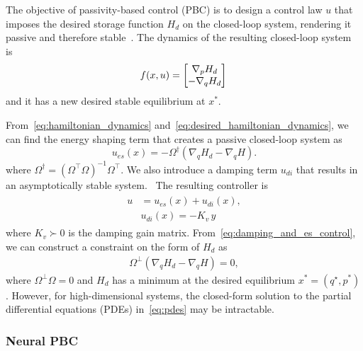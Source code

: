 The objective of passivity-based control (PBC) is to design a control law $u$
that imposes the desired storage function $H_d$ on the closed-loop system,
rendering it passive and therefore stable~\cite{van2000l2}.
%
The dynamics of the resulting closed-loop system is~
\begin{align}
  \begin{split}  
    f(x, u) &= \begin{bmatrix}\nabla_pH_d \\ -\nabla_qH_d\end{bmatrix}\, \\
  \end{split}
  \label{eq:desired_hamiltonian_dynamics}
\end{align}
\noindent and it has a new desired stable equilibrium at $x^*$.

From~\eqref{eq:hamiltonian_dynamics}
and~\eqref{eq:desired_hamiltonian_dynamics}, we can find the energy shaping term
that creates a passive closed-loop system as
%
\begin{equation}
  u_{es}(x) =  -\Omega^{\dagger} \left( \nabla_q H_d - \nabla_q H \right).
  \label{eq:esc}
\end{equation}
\noindent where $\Omega^\dagger = \left( \Omega^\top \Omega  \right)^{-1}
\Omega^\top$. We also introduce a damping term $u_{di}$ that results in an
asymptotically stable system.~ The resulting controller is
\begin{align}
  \begin{split} 
    u &= u_{es}(x) + u_{di}(x), \\
    &u_{di}(x) = - K_{v} \, y
  \end{split}
  \label{eq:damping_and_es_control}
\end{align}
\noindent where $K_v \succ 0$ is the damping gain matrix.
From~\eqref{eq:damping_and_es_control}, we can construct a constraint on the
form of $H_d$ as~
\begin{align}
  \Omega^\bot \left( \nabla_q H_d - \nabla_q H \right) = 0,
    \label{eq:pdes}
\end{align}
where $\Omega^\perp \Omega = 0$ and $H_d$ has a minimum at the desired
equilibrium $x^* = (q^\star, p^*)$. 
%
However, for high-dimensional systems, the closed-form solution to the partial
differential equations (PDEs) in~\eqref{eq:pdes} may be intractable. 

\subsubsection{Neural PBC}

